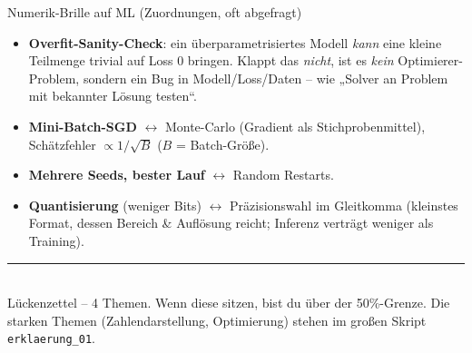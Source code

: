 \documentclass[a4paper,11pt]{article}
\begin{document}
\begin{satz}{Numerik-Brille auf ML (Zuordnungen, oft abgefragt)}
\begin{itemize}
\item \textbf{Overfit-Sanity-Check}: ein überparametrisiertes Modell \emph{kann} eine kleine Teilmenge
  trivial auf Loss $0$ bringen. Klappt das \emph{nicht}, ist es \emph{kein} Optimierer-Problem,
  sondern ein Bug in Modell/Loss/Daten -- wie „Solver an Problem mit bekannter Lösung testen``.
\item \textbf{Mini-Batch-SGD} $\leftrightarrow$ Monte-Carlo (Gradient als Stichprobenmittel),
  Schätzfehler $\propto 1/\sqrt B$ ($B$ = Batch-Größe).
\item \textbf{Mehrere Seeds, bester Lauf} $\leftrightarrow$ Random Restarts.
\item \textbf{Quantisierung} (weniger Bits) $\leftrightarrow$ Präzisionswahl im Gleitkomma
  (kleinstes Format, dessen Bereich \& Auflösung reicht; Inferenz verträgt weniger als Training).
\end{itemize}
\end{satz}

\vspace{6pt}
\noindent\textcolor{rulecol}{\rule{\linewidth}{0.4pt}}\\[2pt]
{\small\color{muted} Lückenzettel -- 4 Themen. Wenn diese sitzen, bist du über der 50\%-Grenze.
Die starken Themen (Zahlendarstellung, Optimierung) stehen im großen Skript \texttt{erklaerung\_01}.}
\end{document}
